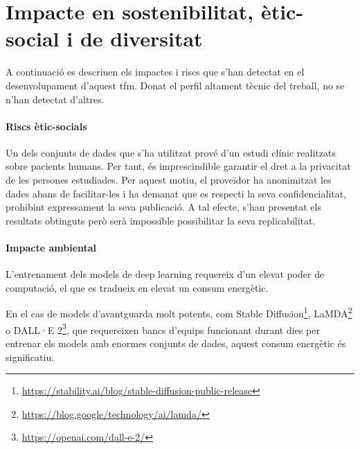 \documentclass[CAT,BIB]{TFUOC}%
\begin{document}
    \section{Impacte en sostenibilitat, ètic-social i de diversitat}
    \label{s:impacte}

        A continuació es descriuen els impactes i riscs
        que s'han detectat en el desenvolupament d'aquest \gls{tfm}.
        Donat el perfil altament tècnic del treball,
        no se n’han detectat d'altres.

        \paragraph{Riscs ètic-socials}
            Un dels conjunts de dades que s'ha utilitzat
            prové d’un estudi clínic realitzats sobre pacients humans.
            Per tant, és imprescindible
            garantir el dret a la privacitat de les persones estudiades.
            Per aquest motiu,
            el proveïdor ha anonimitzat les dades abans de facilitar-les
            i ha demanat que es respecti la seva confidencialitat,
            prohibint expressament la seva publicació.
            A tal efecte,
            s'han presentat els resultats obtinguts
            però serà impossible possibilitar la seva replicabilitat.

        \paragraph{Impacte ambiental}
            L’entrenament dels models de deep learning
            requereix d’un elevat poder de computació,
            el que es tradueix en elevat un consum energètic.

            En el cas de models d’avantguarda molt potents,
            com Stable Diffusion\footnote{\url{https://stability.ai/blog/stable-diffusion-public-release}},
            LaMDA\footnote{\url{https://blog.google/technology/ai/lamda/}}
            o DALL·E 2\footnote{\url{https://openai.com/dall-e-2/}},
            que requereixen bancs d’equips funcionant durant dies
            per entrenar els models amb enormes conjunts de dades,
            aquest consum energètic és significatiu.
\end{document}
